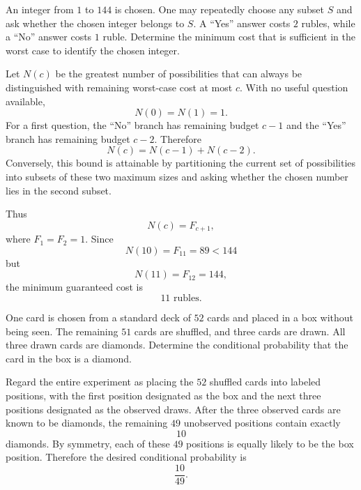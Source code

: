     \begin{expectedproblem}
        An integer from $1$ to $144$ is chosen. One may repeatedly choose any
        subset $S$ and ask whether the chosen integer belongs to $S$. A
        ``Yes'' answer costs $2$ rubles, while a ``No'' answer costs $1$ ruble.
        Determine the minimum cost that is sufficient in the worst case to
        identify the chosen integer.
    \end{expectedproblem}

    \begin{solution}
        Let $N(c)$ be the greatest number of possibilities that can always be
        distinguished with remaining worst-case cost at most $c$. With no
        useful question available,
        \[
            N(0)=N(1)=1.
        \]
        For a first question, the ``No'' branch has remaining budget $c-1$ and
        the ``Yes'' branch has remaining budget $c-2$. Therefore
        \[
            N(c)=N(c-1)+N(c-2).
        \]
        Conversely, this bound is attainable by partitioning the current set
        of possibilities into subsets of these two maximum sizes and asking
        whether the chosen number lies in the second subset.

        Thus
        \[
            N(c)=F_{c+1},
        \]
        where $F_1=F_2=1$. Since
        \[
            N(10)=F_{11}=89<144
        \]
        but
        \[
            N(11)=F_{12}=144,
        \]
        the minimum guaranteed cost is
        \[
            \boxed{11\text{ rubles}}.
        \]
    \end{solution}

    \begin{expectedproblem}
        One card is chosen from a standard deck of $52$ cards and placed in a
        box without being seen. The remaining $51$ cards are shuffled, and
        three cards are drawn. All three drawn cards are diamonds. Determine
        the conditional probability that the card in the box is a diamond.
    \end{expectedproblem}

    \begin{solution}
        Regard the entire experiment as placing the $52$ shuffled cards into
        labeled positions, with the first position designated as the box and
        the next three positions designated as the observed draws. After the
        three observed cards are known to be diamonds, the remaining $49$
        unobserved positions contain exactly
        \[
            10
        \]
        diamonds. By symmetry, each of these $49$ positions is equally likely
        to be the box position. Therefore the desired conditional probability
        is
        \[
            \boxed{\frac{10}{49}}.
        \]
    \end{solution}

